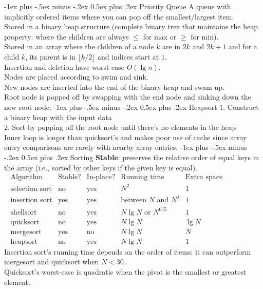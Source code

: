\documentclass[10pt,landscape]{article}
\makeatletter
\renewcommand{\section}{\@startsection{section}{1}{0mm}%
                                {-1ex plus -.5ex minus -.2ex}%
                                {0.5ex plus .2ex}%
                                {\normalfont\large\bfseries}}
\makeatother
\begin{document}
\begin{multicols}{3}
\section{Priority Queue}
A queue with implicitly ordered items where you can pop off the smallest/largest item.\\
Stored in a binary heap structure (complete binary tree that maintains the heap property: where the children are always $\leq$ for max or $\geq$ for min).\\
Stored in an array where the children of a node $k$ are in $2k$ and $2k+1$ and for a child $k$, its parent is in $\lfloor k/2 \rfloor$ and indices start at $1$. \\
Insertion and deletion have worst case $O(\lg n)$. \\
Nodes are placed according to swim and sink.\\
\quad New nodes are inserted into the end of the binary heap and swam up. \\
\quad Root node is popped off by swapping with the end node and sinking down the new root node.
\section{Heapsort}
1. Construct a binary heap with the input data\\
2. Sort by popping off the root node until there's no elements in the heap\\
Inner loop is longer than quicksort's and makes poor use of cache since array entry comparisons are rarely with nearby array entries.
\section{Sorting}
\textbf{Stable}: preserves the relative order of equal keys in the array (i.e., sorted by other keys if the given key is equal).\\
\mbox{\tiny{
$\begin{array}{c|c|c|c|c}
\text{Algorithm} & \text{Stable?} & \text{In-place?} & \text{Running time} & \text{Extra space}\\
\hline
\text{selection sort} & \text{no} & \text{yes} & N^2 & 1\\
\text{insertion sort} & \text{yes} & \text{yes} & \text{between } N \text{ and } N^2 & 1\\
\text{shellsort} & \text{no} & \text{yes} & N\lg N \text{ or } N^{6/5} & 1\\
\text{quicksort} & \text{no} & \text{yes} & N\lg N & \lg N\\
\text{mergesort} & \text{yes} & \text{no} & N\lg N & N\\
\text{heapsort} & \text{no} & \text{yes} & N\lg N & 1
\end{array}$}}\\
Insertion sort's running time depends on the order of items; it can outperform mergesort and quicksort when $N<30$.\\
Quicksort's worst-case is quadratic when the pivot is the smallest or greatest element.\\


\end{multicols}
\end{document}
